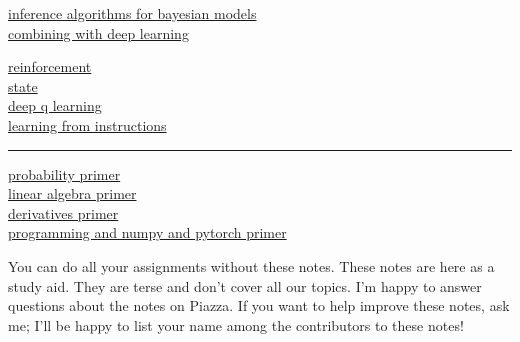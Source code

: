 \documentclass[11pt, justified]{tufte-book}
\begin{document}
{\begin{description}
\begin{description}
          \item[\hyperlink{D2}{inference algorithms for bayesian models}]
          \item[\hyperlink{D3}{combining with deep learning}]
        \end{description}
      \item[E. beyond learning-from-examples]                       \phdot  \hfill\pageref{part:E}
        \begin{description}
          \item[\hyperlink{E0}{reinforcement}]
          \item[\hyperlink{E1}{state}]
          \item[\hyperlink{E2}{deep q learning}]
          \item[\hyperlink{E3}{learning from instructions}]
        \end{description}
      \item[] \vspace{0.05cm} \hrule \vspace{-0.05cm}
      \item[F. appendices]                                          \phdot  \hfill\pageref{part:F}
        \begin{description}
          \item[\hyperlink{F0}{probability primer}]
          \item[\hyperlink{F1}{linear algebra primer}]
          \item[\hyperlink{F2}{derivatives primer}]
          \item[\hyperlink{F3}{programming and numpy and pytorch primer}]
        \end{description}
    \end{description}
  }
  You can do all your assignments without
  these notes.  These notes are here as a study aid.  They are terse and don't
  cover all our topics.  I'm happy to answer questions about the notes on
  Piazza.  If you want to help improve these notes, ask me; I'll be happy to
  list your name among the contributors to these notes!

  \newpage

    \label{part:A}
      \hypertarget{A2}{}
      
      \hypertarget{A2}{}
      
      \hypertarget{A2}{}
      
      \hypertarget{A2}{}
      
\end{document}
